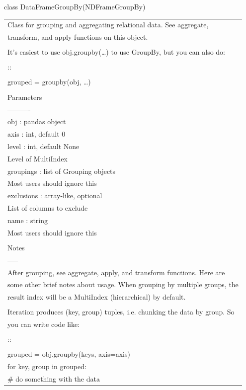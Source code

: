 \documentclass[11pt]{article}
\begin{document}
\begin{enumerate}
\begin{enumerate}
\begin{enumerate}
class DataFrameGroupBy(NDFrameGroupBy)
\begin{center}
\begin{tabular}{l}
Class for grouping and aggregating relational data. See aggregate,\\
transform, and apply functions on this object.\\
\\
It's easiest to use obj.groupby(\ldots{}) to use GroupBy, but you can also do:\\
\\
::\\
\\
grouped = groupby(obj, \ldots{})\\
\\
Parameters\\
----------\\
obj : pandas object\\
axis : int, default 0\\
level : int, default None\\
Level of MultiIndex\\
groupings : list of Grouping objects\\
Most users should ignore this\\
exclusions : array-like, optional\\
List of columns to exclude\\
name : string\\
Most users should ignore this\\
\\
Notes\\
-----\\
After grouping, see aggregate, apply, and transform functions. Here are\\
some other brief notes about usage. When grouping by multiple groups, the\\
result index will be a MultiIndex (hierarchical) by default.\\
\\
Iteration produces (key, group) tuples, i.e. chunking the data by group. So\\
you can write code like:\\
\\
::\\
\\
grouped = obj.groupby(keys, axis=axis)\\
for key, group in grouped:\\
\# do something with the data\\

\end{tabular}
\end{center}
\end{enumerate}
\end{enumerate}
\end{enumerate}
\end{document}
